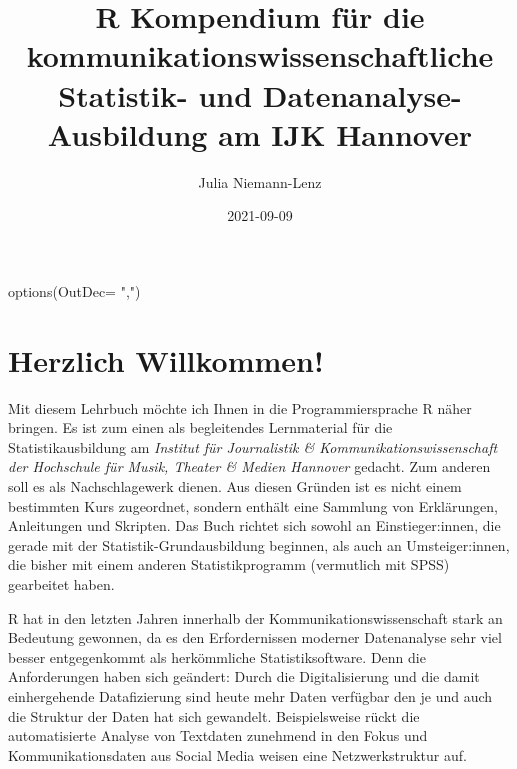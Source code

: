 \documentclass[
]{book}
\title{R Kompendium für die kommunikationswissenschaftliche Statistik- und Datenanalyse-Ausbildung am IJK Hannover}
\author{Julia Niemann-Lenz}
\date{2021-09-09}
\newenvironment{Shaded}{\begin{snugshade}}{\end{snugshade}}
\newcommand{\AttributeTok}[1]{\textcolor[rgb]{0.77,0.63,0.00}{#1}}
\newcommand{\FunctionTok}[1]{\textcolor[rgb]{0.00,0.00,0.00}{#1}}
\newcommand{\NormalTok}[1]{#1}
\newcommand{\StringTok}[1]{\textcolor[rgb]{0.31,0.60,0.02}{#1}}
\begin{document}
\maketitle

{
\setcounter{tocdepth}{1}
\tableofcontents
}
\begin{Shaded}
\begin{Highlighting}[]
\FunctionTok{options}\NormalTok{(}\AttributeTok{OutDec=} \StringTok{","}\NormalTok{)}
\end{Highlighting}
\end{Shaded}

\hypertarget{herzlich-willkommen}{%
\chapter*{Herzlich Willkommen!}\label{herzlich-willkommen}}

Mit diesem Lehrbuch möchte ich Ihnen in die Programmiersprache R näher bringen. Es ist zum einen als begleitendes Lernmaterial für die Statistikausbildung am \emph{Institut für Journalistik \& Kommunikationswissenschaft der Hochschule für Musik, Theater \& Medien Hannover} gedacht. Zum anderen soll es als Nachschlagewerk dienen. Aus diesen Gründen ist es nicht einem bestimmten Kurs zugeordnet, sondern enthält eine Sammlung von Erklärungen, Anleitungen und Skripten. Das Buch richtet sich sowohl an Einstieger:innen, die gerade mit der Statistik-Grundausbildung beginnen, als auch an Umsteiger:innen, die bisher mit einem anderen Statistikprogramm (vermutlich mit SPSS) gearbeitet haben.

R hat in den letzten Jahren innerhalb der Kommunikationswissenschaft stark an Bedeutung gewonnen, da es den Erfordernissen moderner Datenanalyse sehr viel besser entgegenkommt als herkömmliche Statistiksoftware. Denn die Anforderungen haben sich geändert: Durch die Digitalisierung und die damit einhergehende Datafizierung sind heute mehr Daten verfügbar den je und auch die Struktur der Daten hat sich gewandelt. Beispielsweise rückt die automatisierte Analyse von Textdaten zunehmend in den Fokus und Kommunikationsdaten aus Social Media weisen eine Netzwerkstruktur auf.
\end{document}
